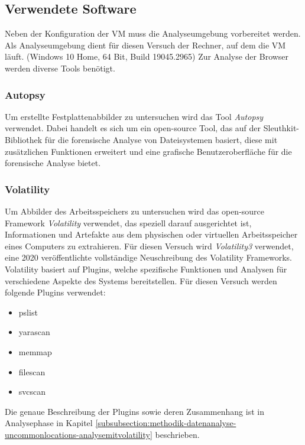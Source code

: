 \subsection*{Verwendete Software}
\label{subsection:methodik-vorbereitung-verwendetesoftware}
Neben der Konfiguration der VM muss die Analyseumgebung vorbereitet werden. Als Analyseumgebung dient für diesen Versuch der Rechner, auf dem die VM läuft. (Windows 10 Home, 64 Bit, Build 19045.2965)
Zur Analyse der Browser werden diverse Tools benötigt.

\subsubsection*{Autopsy}
\label{subsubsection:methodik-vorbereitung-verwendetesoftware-autopsy}
Um erstellte Festplattenabbilder zu untersuchen wird das Tool \textit{Autopsy} verwendet. Dabei handelt es sich um ein open-source Tool, das auf der Sleuthkit-Bibliothek für die forensische Analyse von Dateisystemen basiert, diese mit zusätzlichen Funktionen erweitert und eine grafische Benutzeroberfläche für die forensische Analyse bietet.   

\subsubsection*{Volatility}
\label{subsubsection:methodik-vorbereitung-verwendetesoftware-volatility}
Um Abbilder des Arbeitsspeichers zu untersuchen wird das open-source Framework \textit{Volatility} verwendet, das speziell darauf ausgerichtet ist, Informationen und Artefakte aus dem physischen oder virtuellen Arbeitsspeicher eines Computers zu extrahieren.
Für diesen Versuch wird \textit{Volatility3} verwendet, eine 2020 veröffentlichte vollständige Neuschreibung des Volatility Frameworks.
Volatility basiert auf Plugins, welche spezifische Funktionen und Analysen für verschiedene Aspekte des Systems bereitstellen. Für diesen Versuch werden folgende Plugins verwendet:
\begin{itemize}
\item pslist	
\item yarascan		
\item memmap	 	
\item filescan
\item svcscan
\end{itemize}
Die genaue Beschreibung der Plugins sowie deren Zusammenhang ist in Analysephase in Kapitel \ref{subsubsection:methodik-datenanalyse-uncommonlocations-analysemitvolatility} beschrieben.

